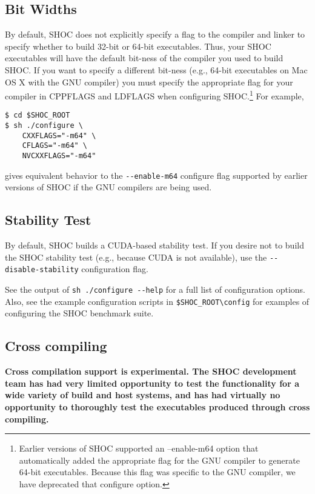 \documentclass[11pt]{article}
\begin{document}
\subsection{Bit Widths}\label{sec:confbitwidth}

By default, SHOC does not explicitly specify a flag to the compiler and 
linker to specify whether to build 32-bit or 64-bit executables.
Thus, your SHOC executables will have the default bit-ness of the compiler 
you used to build SHOC.
If you want to specify a different bit-ness (e.g., 64-bit executables on 
Mac OS X with the GNU compiler) you must specify the appropriate flag
for your compiler in CPPFLAGS and LDFLAGS when configuring 
SHOC.\footnote{Earlier versions of SHOC supported an --enable-m64 option 
that automatically added the appropriate flag for the GNU compiler to generate
64-bit executables.  Because this flag was specific to the GNU compiler, we have
deprecated that configure option.}
For example,
\begin{Verbatim}[frame=single]
$ cd $SHOC_ROOT
$ sh ./configure \
    CXXFLAGS="-m64" \
    CFLAGS="-m64" \
    NVCXXFLAGS="-m64"
\end{Verbatim}
\noindent gives equivalent behavior to the \verb+--enable-m64+ configure flag
supported by earlier versions of SHOC if the GNU compilers are being used.

\subsection{Stability Test}\label{sec:confstability}

By default, SHOC builds a CUDA-based stability test.
If you desire not to build the SHOC stability test (e.g., because CUDA is
not available), use the \verb+--disable-stability+ configuration flag.

See the output of \verb+sh ./configure --help+ for a full list of configuration 
options.
Also, see the example configuration scripts in \verb+$SHOC_ROOT\config+ for
examples of configuring the SHOC benchmark suite.

\subsection{Cross compiling}

{\bf 
Cross compilation support is experimental.
The SHOC development team has had very limited opportunity to test the
functionality for a wide variety of build and host systems, and has had
virtually no opportunity to thoroughly test the executables produced through
cross compiling.
}
\end{document}
